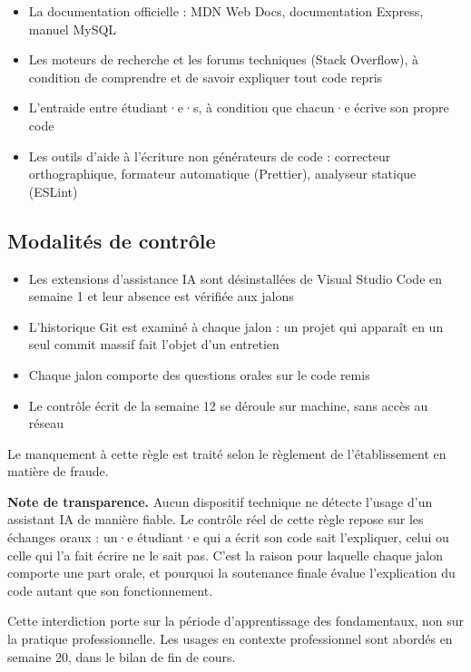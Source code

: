 \documentclass[a4paper,11pt]{article}
\begin{document}
\begin{itemize}
  \item La documentation officielle : MDN Web Docs, documentation Express, manuel MySQL
  \item Les moteurs de recherche et les forums techniques (Stack Overflow), à condition de comprendre et de savoir expliquer tout code repris
  \item L'entraide entre étudiant·e·s, à condition que chacun·e écrive son propre code
  \item Les outils d'aide à l'écriture non générateurs de code : correcteur orthographique, formateur automatique (Prettier), analyseur statique (ESLint)
\end{itemize}

\subsection{Modalités de contrôle}

\begin{itemize}
  \item Les extensions d'assistance IA sont désinstallées de Visual Studio Code en semaine 1 et leur absence est vérifiée aux jalons
  \item L'historique Git est examiné à chaque jalon : un projet qui apparaît en un seul commit massif fait l'objet d'un entretien
  \item Chaque jalon comporte des questions orales sur le code remis
  \item Le contrôle écrit de la semaine 12 se déroule sur machine, sans accès au réseau
\end{itemize}

\medskip
\noindent Le manquement à cette règle est traité selon le règlement de l'établissement en matière de fraude.

\begin{tcolorbox}[intro]
\small
\textbf{Note de transparence.} Aucun dispositif technique ne détecte l'usage d'un assistant IA de manière fiable. Le contrôle réel de cette règle repose sur les échanges oraux : un·e étudiant·e qui a écrit son code sait l'expliquer, celui ou celle qui l'a fait écrire ne le sait pas. C'est la raison pour laquelle chaque jalon comporte une part orale, et pourquoi la soutenance finale évalue l'explication du code autant que son fonctionnement.

Cette interdiction porte sur la période d'apprentissage des fondamentaux, non sur la pratique professionnelle. Les usages en contexte professionnel sont abordés en semaine 20, dans le bilan de fin de cours.
\end{tcolorbox}
\end{document}
